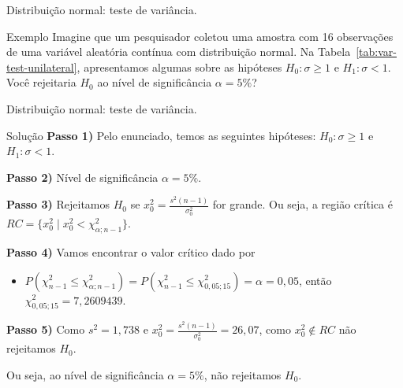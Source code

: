 \documentclass[8pt]{beamer}
\begin{document}
\begin{frame}{Distribuição normal: teste de variância.}

\large

\begin{block}{Exemplo}
	Imagine que um pesquisador coletou uma amostra com 16 observações de uma variável aleatória contínua com distribuição normal. Na Tabela~\ref{tab:var-test-unilateral}, apresentamos algumas sobre as hipóteses $H_0: \sigma \geq 1$ e $H_1: \sigma < 1$. Você rejeitaria $H_0$ ao nível de significância $\alpha=5\%$?
	\begin{table}[ht]
		\centering
		\caption{Algumas informações do experimento.} 
		\label{tab:var-test-unilateral}
	\end{table}
\end{block}
\vfill

\normalsize
\end{frame}

\begin{frame}{Distribuição normal: teste de variância.}

\begin{block}{Solução}
	\textbf{Passo 1)} Pelo enunciado, temos as seguintes hipóteses: $H_0: \sigma \geq 1$ e $H_1: \sigma < 1$.
	
	\textbf{Passo 2)} Nível de significância $\alpha=5\%$.
	
	\textbf{Passo 3)} Rejeitamos $H_0$ se $x_0^2=\frac{s^2(n-1)}{\sigma_0^2}$ for grande. Ou seja, a região crítica é $RC=\{ x_0^2 \mid x_0^2 < \chi_{\alpha; n-1}^2 \}$.
	
	\textbf{Passo 4)} Vamos encontrar o valor crítico dado por
	\begin{itemize}
		\item $P\left( \chi_{n-1}^2 \leq \chi_{\alpha;n-1}^2 \right) = P\left( \chi_{n-1}^2 \leq \chi_{0,05;15}^2 \right) = \alpha=0,05$, então $\chi_{0,05;15}^2=7,2609439$.
	\end{itemize}
	
	\textbf{Passo 5)} Como $s^2 = 1,738$ e $x_0^2=\frac{s^2(n-1)}{\sigma_0^2} = 26,07$, como $x_0^2 \not\in RC$ não rejeitamos $H_0$.
	
	Ou seja, ao nível de significância $\alpha=5\%$, não rejeitamos $H_0$.
\end{block}

\end{frame}
\end{document}
